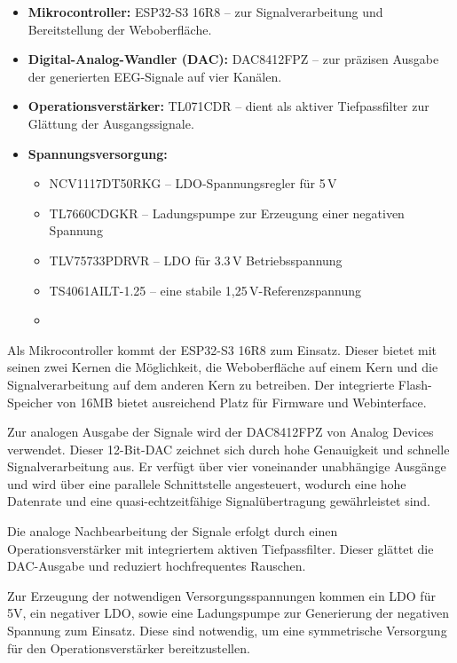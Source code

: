 \begin{itemize} 
    \item \textbf{Mikrocontroller:} ESP32-S3 16R8 – zur Signalverarbeitung und Bereitstellung der Weboberfläche. 
    \item \textbf{Digital-Analog-Wandler (DAC):} DAC8412FPZ – zur präzisen Ausgabe der generierten EEG-Signale auf vier Kanälen. 
    \item \textbf{Operationsverstärker:} TL071CDR – dient als aktiver Tiefpassfilter zur Glättung der Ausgangssignale. 
    \item \textbf{Spannungsversorgung:}
    \begin{itemize}
        \item NCV1117DT50RKG – LDO-Spannungsregler für 5 V
        \item TL7660CDGKR – Ladungspumpe zur Erzeugung einer negativen Spannung
        \item TLV75733PDRVR – LDO für 3.3 V Betriebsspannung
        \item TS4061AILT-1.25 – eine stabile 1{,}25\,V-Referenzspannung        \item 
    \end{itemize}
\end{itemize}

Als Mikrocontroller kommt der ESP32-S3 16R8 zum Einsatz. Dieser bietet mit seinen zwei Kernen die Möglichkeit, die Weboberfläche auf einem Kern und die Signalverarbeitung auf dem anderen Kern zu betreiben. Der integrierte Flash-Speicher von 16MB bietet ausreichend Platz für Firmware und Webinterface.

Zur analogen Ausgabe der Signale wird der DAC8412FPZ von Analog Devices verwendet. Dieser 12-Bit-DAC zeichnet sich durch hohe Genauigkeit und schnelle Signalverarbeitung aus. Er verfügt über vier voneinander unabhängige Ausgänge und wird über eine parallele Schnittstelle angesteuert, wodurch eine hohe Datenrate und eine quasi-echtzeitfähige Signalübertragung gewährleistet sind.

Die analoge Nachbearbeitung der Signale erfolgt durch einen Operationsverstärker mit integriertem aktiven Tiefpassfilter. Dieser glättet die DAC-Ausgabe und reduziert hochfrequentes Rauschen.

Zur Erzeugung der notwendigen Versorgungsspannungen kommen ein LDO für 5V, ein negativer LDO, sowie eine Ladungspumpe zur Generierung der negativen Spannung zum Einsatz. Diese sind notwendig, um eine symmetrische Versorgung für den Operationsverstärker bereitzustellen.

